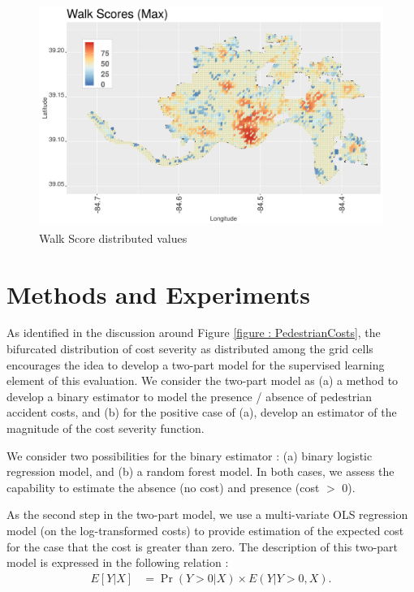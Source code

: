 \documentclass{llncs}
\begin{document}
\FloatBarrier
\begin{figure}
 	\includegraphics[width=\textwidth, height=\textheight, keepaspectratio]{walkScore}
 	\caption{Walk Score\textsuperscript{\tiny\textregistered} distributed values}
	\label{figure : walkScore}
\end{figure}
\FloatBarrier

\section{Methods and Experiments}

As identified in the discussion around Figure \ref{figure : PedestrianCosts}, the bifurcated distribution of cost severity as distributed among the grid cells encourages the idea to develop a two-part model for the supervised learning element of this evaluation. We consider the two-part model as (a) a method to develop a binary estimator to model the presence / absence of pedestrian accident costs, and (b) for the positive case of (a), develop an estimator of the magnitude of the cost severity function.

We consider two possibilities for the binary estimator : (a) binary logistic regression model, and (b) a random forest model. In both cases, we assess the capability to estimate the absence (no cost) and presence (cost $>$ 0).

As the second step in the two-part model, we use a multi-variate OLS regression model (on the log-transformed costs) to provide estimation of the expected cost for the case that the cost is greater than zero. The description of this two-part model is expressed in the following relation : 
% 
\begin{align}
E[Y| X] &= \Pr(Y > 0 | X)\times E(Y | Y > 0,  X).
\end{align}
\end{document}
